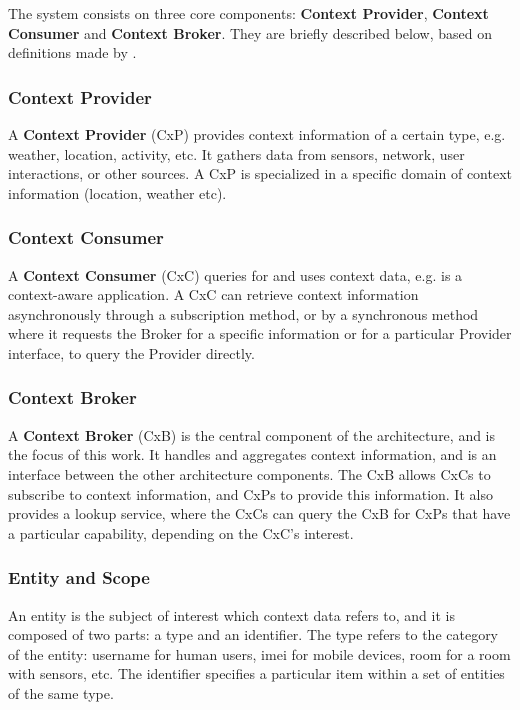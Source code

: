 The system consists on three core components: \textbf{Context Provider}, \textbf{Context Consumer} and \textbf{Context Broker}. They are briefly described below, based on definitions made by \cite{knappmeyer2010contextml}. 

\subsubsection{Context Provider}
A \textbf{Context Provider} (CxP) provides context information of a certain type, e.g. weather, location, activity, etc. It gathers data from sensors, network, user interactions, or other sources. A CxP is specialized in a specific domain of context information (location, weather etc).


\subsubsection{Context Consumer}
A \textbf{Context Consumer} (CxC) queries for and uses context data, e.g. is a context-aware application. A CxC can retrieve context information asynchronously through a subscription method, or by a synchronous method where it requests the Broker for a specific information or for a particular Provider interface, to query the Provider directly.

\subsubsection{Context Broker}
A \textbf{Context Broker} (CxB) is the central component of the architecture, and is the focus of this work. It handles and aggregates context information, and is an interface between the other architecture components. The CxB allows CxCs to subscribe to context information, and CxPs to provide this information. It also provides a lookup service, where the CxCs can query the CxB for CxPs that have a particular capability, depending on the CxC’s interest.

\subsubsection{Entity and Scope}
An entity is the subject of interest which context data refers to, and it is composed of two parts: a type and an identifier. The type refers to the category of the entity: username for human users, imei for mobile devices, room for a room with sensors, etc. The identifier specifies a particular item within a set of entities of the same type.

